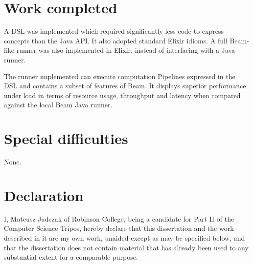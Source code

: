 {\section*{Work completed}

A DSL was implemented which required significantly less code to express concepts than the Java API.
It also adopted standard Elixir idioms.
A full Beam-like runner was also implemented in Elixir, instead of interfacing with a Java runner.

The runner implemented can execute computation Pipelines expressed in the DSL and contains a subset of features of Beam.
It displays superior performance under load in terms of resource usage, throughput and latency when compared against the local Beam Java runner.

\section*{Special difficulties}

None.

\section*{Declaration}

I, Mateusz Jadczak of Robinson College, being a candidate for Part II of the Computer Science Tripos, hereby declare that this dissertation and the work described in it are my own work, unaided except as may be specified below, and that the dissertation does not contain material that has already been used to any substantial extent for a comparable purpose. 

\bigskip
{}

\medskip
{}


\tableofcontents
\listoffigures
\listoflistings
\listoftables
} %
